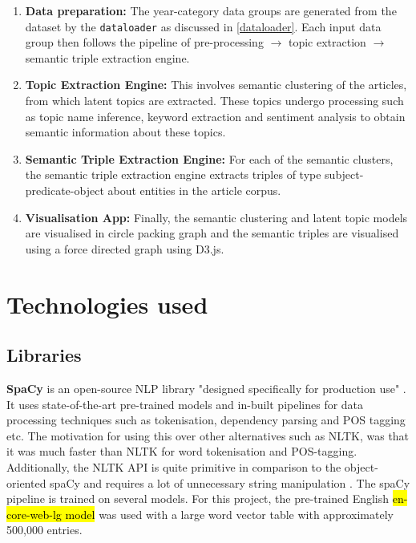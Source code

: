 \begin{enumerate}
    \item \textbf{Data preparation: }The year-category data groups are generated from the dataset by the \texttt{dataloader} as discussed in \ref{dataloader}. Each input data group then follows the pipeline of pre-processing $\rightarrow$ topic extraction $\rightarrow$ semantic triple extraction engine. 
    
    \item \textbf{Topic Extraction Engine:} This involves semantic clustering of the articles, from which latent topics are extracted. These topics undergo processing such as topic name inference, keyword extraction and sentiment analysis to obtain semantic information about these topics.
    
    \item \textbf{Semantic Triple Extraction Engine:} For each of the semantic  clusters, the semantic triple extraction engine extracts triples of type subject-predicate-object about entities in the article corpus. 
    
    \item \textbf{Visualisation App: } Finally, the semantic clustering and latent topic models are visualised in circle packing graph and the semantic triples are visualised using a force directed graph using D3.js. 
    
\end{enumerate}
\section{Technologies used}
\subsection{Libraries} \label{libraries}

\textbf{SpaCy} is an open-source NLP library "designed specifically for production use" \cite{spacy}. It uses state-of-the-art pre-trained models and in-built pipelines for data processing techniques such as tokenisation, dependency parsing and POS tagging etc. The motivation for using this over other alternatives such as NLTK, was that it was much faster than NLTK for word tokenisation and POS-tagging. Additionally, the NLTK API is quite primitive in comparison to the object-oriented spaCy and requires a lot of unnecessary string manipulation \cite{spacy-nltk}. The spaCy pipeline is trained on several models. For this project, the pre-trained English \hl{en-core-web-lg model} was used with a large word vector table with approximately 500,000 entries.  

